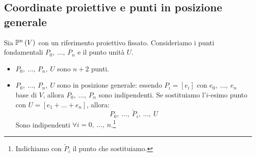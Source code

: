 \subsection{Coordinate proiettive e punti in posizione generale}
\begin{observe}
	Sia $\proj{V}$ con un riferimento proiettivo fissato. Consideriamo i punti fondamentali $P_0,\ \ldots,\ P_n$ e il punto unità $U$.
	\begin{itemize}
		\item $P_0,\ \ldots,\ P_n,\ U$ sono $n+2$ punti.
		\item $P_0,\ \ldots,\ P_n,\ U$ sono in posizione generale: essendo $P_i=\left[e_i\right]$ con $e_0,\ \ldots,\ e_n$ base di $V$, allora $P_0,\ \ldots,\ P_n$ sono indipendenti. Se sostituiamo l'$i$-esimo punto con $U=\left[e_1+\ldots+e_n\right]$, allora:
		\begin{equation*}
			P_0,\ \ldots,\ \check{P}_i,\ \ldots,\ U
		\end{equation*}
	Sono indipendenti $\forall i=0,\ \ldots,\ n$.\footnote{Indichiamo con $\check{P}_{i}$ il punto che sostituiamo.}
	\end{itemize}
\end{observe}
